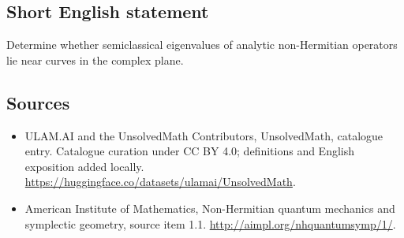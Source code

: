 \documentclass[11pt]{article}
\begin{document}
\subsection{Short English statement}
Determine whether semiclassical eigenvalues of analytic non-Hermitian operators lie near curves in the complex plane.
\subsection{Sources}
\begin{itemize}
\item[\hypertarget{source:statement:1}{S1}] ULAM.AI and the UnsolvedMath Contributors, UnsolvedMath, catalogue entry. Catalogue curation under CC BY 4.0; definitions and English exposition added locally.
\url{https://huggingface.co/datasets/ulamai/UnsolvedMath}.
\item[\hypertarget{source:statement:2}{S2}] American Institute of Mathematics, Non-Hermitian quantum mechanics and symplectic geometry, source item 1.1.
\url{http://aimpl.org/nhquantumsymp/1/}.
\end{itemize}
\label{end:statement}
\end{document}
